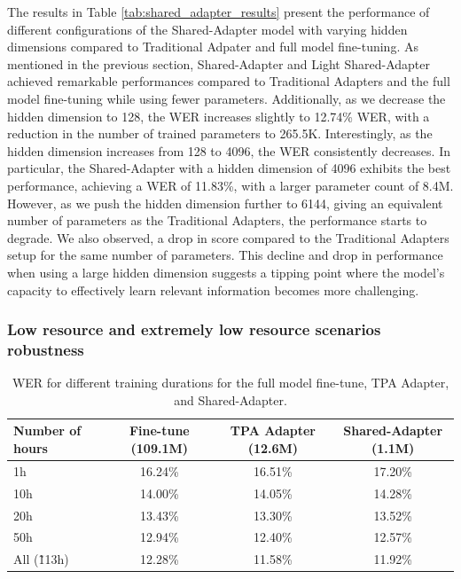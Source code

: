The results in Table \ref{tab:shared_adapter_results} present the performance of different configurations of the Shared-Adapter model with varying hidden dimensions compared to Traditional Adpater and full model fine-tuning. As mentioned in the previous section, Shared-Adapter and Light Shared-Adapter achieved remarkable performances compared to Traditional Adapters and the full model fine-tuning while using fewer parameters. Additionally, as we decrease the hidden dimension to 128, the WER increases slightly to 12.74\% \ac{WER}, with a reduction in the number of trained parameters to 265.5K. Interestingly, as the hidden dimension increases from 128 to 4096, the \ac{WER} consistently decreases. In particular, the Shared-Adapter with a hidden dimension of 4096 exhibits the best performance, achieving a \ac{WER} of 11.83\%, with a larger parameter count of 8.4M. 
However, as we push the hidden dimension further to 6144, giving an equivalent number of parameters as the Traditional Adapters, the performance starts to degrade. We also observed, a drop in score compared to the Traditional Adapters setup for the same number of parameters. This decline and drop in performance when using a large hidden dimension suggests a tipping point where the model's capacity to effectively learn relevant information becomes more challenging.


\subsubsection{Low resource and extremely low resource scenarios robustness}
\label{sec:hours_PETL}
\begin{table}[ht]
    \centering
    \begin{tabular}{l c c c}
        \hline
        Number of hours & Fine-tune (109.1M) & TPA Adapter (12.6M) & Shared-Adapter (1.1M) \\
        \hline
        1h & 16.24\% & 16.51\% & 17.20\% \\
        10h & 14.00\% & 14.05\% & 14.28\% \\
        20h & 13.43\% & 13.30\% & 13.52\% \\
        50h & 12.94\% & 12.40\% & 12.57\% \\
        All (\~113h) & 12.28\% & 11.58\% & 11.92\% \\
        \hline
    \end{tabular}
    \caption{WER for different training durations for the full model fine-tune, TPA Adapter, and Shared-Adapter.}
    \label{tab:training_duration_results}
\end{table}

